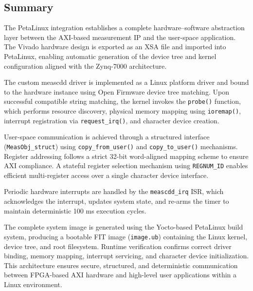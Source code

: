 \subsection{Summary}
The PetaLinux integration establishes a complete hardware–software abstraction layer between the AXI-based measurement IP and the user-space application. The Vivado hardware design is exported as an XSA file and imported into PetaLinux, enabling automatic generation of the device tree and kernel configuration aligned with the Zynq-7000 architecture.

The custom meascdd driver is implemented as a Linux platform driver and bound to the hardware instance using Open Firmware device tree matching. Upon successful compatible string matching, the kernel invokes the \texttt{probe()} function, which performs resource discovery, physical memory mapping using \texttt{ioremap()}, interrupt registration via \texttt{request\_irq()}, and character device creation.

User-space communication is achieved through a structured interface (\texttt{MeasObj\_struct}) using \texttt{copy\_from\_user()} and \texttt{copy\_to\_user()} mechanisms. Register addressing follows a strict 32-bit word-aligned mapping scheme to ensure AXI compliance. A stateful register selection mechanism using \texttt{REGNUM\_ID} enables efficient multi-register access over a single character device interface.

Periodic hardware interrupts are handled by the \texttt{meascdd\_irq} ISR, which acknowledges the interrupt, updates system state, and re-arms the timer to maintain deterministic 100 ms execution cycles.

The complete system image is generated using the Yocto-based PetaLinux build system, producing a bootable FIT image (\texttt{image.ub}) containing the Linux kernel, device tree, and root filesystem. Runtime verification confirms correct driver binding, memory mapping, interrupt servicing, and character device initialization.
This architecture ensures secure, structured, and deterministic communication between FPGA-based AXI hardware and high-level user applications within a Linux environment.

